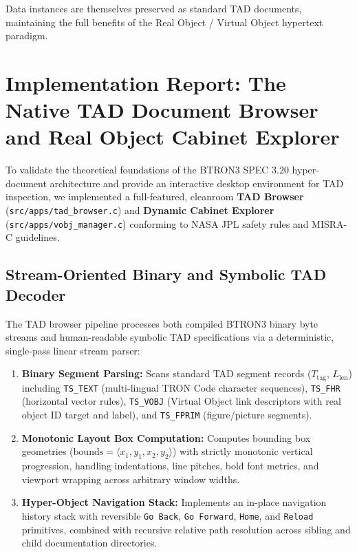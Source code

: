 \documentclass[10pt,journal,compsoc,twocolumn]{article}
\begin{document}
Data instances are themselves preserved as standard TAD documents, maintaining the full benefits of the Real Object / Virtual Object hypertext paradigm.

\section{Implementation Report: The Native TAD Document Browser and Real Object Cabinet Explorer}
\label{sec:implementation_report}

To validate the theoretical foundations of the BTRON3 SPEC 3.20 hyper-document architecture and provide an interactive desktop environment for TAD inspection, we implemented a full-featured, cleanroom \textbf{TAD Browser} (\texttt{src/apps/tad\_browser.c}) and \textbf{Dynamic Cabinet Explorer} (\texttt{src/apps/vobj\_manager.c}) conforming to NASA JPL safety rules and MISRA-C guidelines.

\subsection{Stream-Oriented Binary and Symbolic TAD Decoder}
The TAD browser pipeline processes both compiled BTRON3 binary byte streams and human-readable symbolic TAD specifications via a deterministic, single-pass linear stream parser:
\begin{enumerate}[leftmargin=*]
    \item \textbf{Binary Segment Parsing:} Scans standard TAD segment records ($T_{\text{tag}}$, $L_{\text{len}}$) including \texttt{TS\_TEXT} (multi-lingual TRON Code character sequences), \texttt{TS\_FHR} (horizontal vector rules), \texttt{TS\_VOBJ} (Virtual Object link descriptors with real object ID target and label), and \texttt{TS\_FPRIM} (figure/picture segments).
    \item \textbf{Monotonic Layout Box Computation:} Computes bounding box geometries ($\text{bounds} = \langle x_1, y_1, x_2, y_2 \rangle$) with strictly monotonic vertical progression, handling indentations, line pitches, bold font metrics, and viewport wrapping across arbitrary window widths.
    \item \textbf{Hyper-Object Navigation Stack:} Implements an in-place navigation history stack with reversible \texttt{Go Back}, \texttt{Go Forward}, \texttt{Home}, and \texttt{Reload} primitives, combined with recursive relative path resolution across sibling and child documentation directories.
\end{enumerate}
\end{document}
